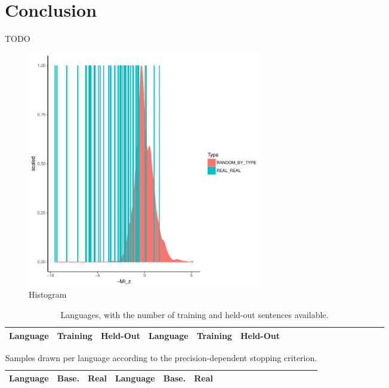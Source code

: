 \documentclass[11pt,letterpaper]{article}
\begin{document}



\section{Conclusion}

TODO





\appendix






\begin{figure}
\includegraphics[width=0.5\textwidth]{../code/visualize_neural/figures/full-REAL-listener-surprisal-memory-HIST_z_byMem_onlyWordForms_boundedVocab.pdf}
\caption{Histogram}\label{fig:hist-real}
\end{figure}


\begin{table}
\begin{longtable}{l|ll||l|llllllllllllll}
	Language & Training & Held-Out & 	Language & Training & Held-Out\\ \hline

\end{longtable}
	\caption{Languages, with the number of training and held-out sentences available.}\label{tab:corpora}
\end{table}

\begin{table}
\begin{longtable}{l|ll||l|llllllllllllll}
	Language & Base. & Real & Language & Base. & Real \\ \hline

\end{longtable}
	\caption{Samples drawn per language according to the precision-dependent stopping criterion.}\label{tab:samples}
\end{table}
\end{document}
